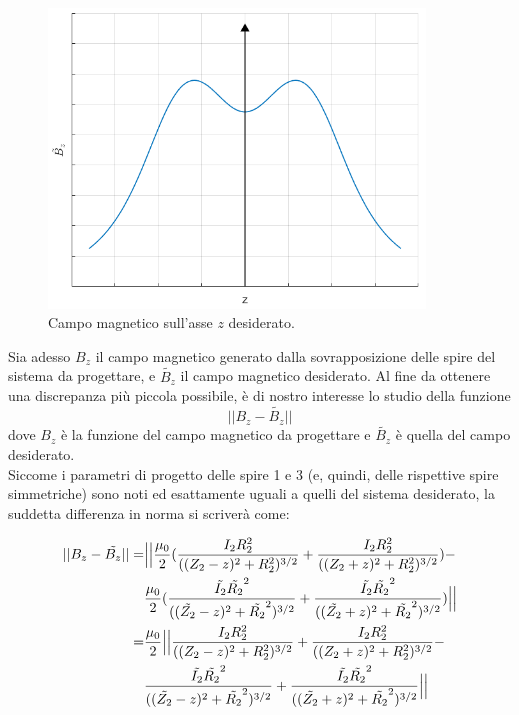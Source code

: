 \documentclass[a4paper, 11pt]{article}
\begin{document}
\begin{figure}[H]
	\centering
	\includegraphics[width=10cm]{assets/figure3}
	\caption{Campo magnetico sull'asse $z$ desiderato.}
\end{figure}
\noindent
Sia adesso $B_{z}$ il campo magnetico generato dalla sovrapposizione delle spire
del sistema da progettare, e $\tilde{B_{z}}$ il campo magnetico desiderato. Al
fine da ottenere una discrepanza più piccola possibile, è di nostro interesse lo
studio della funzione
\[||B_{z}-\tilde{B_{z}}||\] dove $B_{z}$ è la funzione del campo magnetico da
progettare e $\tilde{B_{z}}$ è quella del campo desiderato. \\
Siccome i parametri di progetto delle spire 1 e 3 (e, quindi, delle rispettive
spire simmetriche) sono noti ed esattamente uguali a quelli del sistema
desiderato, la suddetta differenza in norma si scriverà come:

\begin{equation}
	\begin{split}
		||B_{z}-\tilde{B_{z}}||
		=& \Bigl|\Bigl|\frac{\mu_{0}}{2}(\frac{I_{2}R_{2}^{2}}{((Z_{2}-z)^{2}+R_{2}^{2})^{3/2}}+\frac{I_{2}R_{2}^{2}}{((Z_{2}+z)^{2}+R_{2}^{2})^{3/2}})- \\
		 & \frac{\mu_{0}}{2}(\frac{\tilde{I_{2}}\tilde{R_{2}}^{2}}{((\tilde{Z_{2}}-z)^{2}+\tilde{R_{2}}^{2})^{3/2}}+\frac{\tilde{I_{2}}\tilde{R_{2}}^{2}}{((\tilde{Z_{2}}+z)^{2}+\tilde{R_{2}}^{2})^{3/2}})\Bigr|\Bigr| \\
		=& \frac{\mu_{0}}{2}\Bigl|\Bigl|\frac{I_{2}R_{2}^{2}}{((Z_{2}-z)^{2}+R_{2}^{2})^{3/2}}+\frac{I_{2}R_{2}^{2}}{((Z_{2}+z)^{2}+R_{2}^{2})^{3/2}}- \\
		 & \frac{\tilde{I_{2}}\tilde{R_{2}}^{2}}{((\tilde{Z_{2}}-z)^{2}+\tilde{R_{2}}^{2})^{3/2}}+\frac{\tilde{I_{2}}\tilde{R_{2}}^{2}}{((\tilde{Z_{2}}+z)^{2}+\tilde{R_{2}}^{2})^{3/2}}\Bigr|\Bigr|
	\end{split} 
\end{equation}
\noindent
\end{document}
